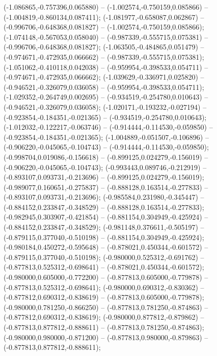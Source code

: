  (-1.086865,-0.757396,0.065880) -- (-1.002574,-0.750159,0.085866) -- (-1.004819,-0.860134,0.087411);
 (-1.081977,-0.658087,0.062867) -- (-0.996706,-0.648368,0.081827) -- (-1.002574,-0.750159,0.085866);
 (-1.074148,-0.567053,0.058040) -- (-0.987339,-0.555715,0.075381) -- (-0.996706,-0.648368,0.081827);
 (-1.063505,-0.484865,0.051479) -- (-0.974671,-0.472935,0.066662) -- (-0.987339,-0.555715,0.075381);
 (-1.051062,-0.410118,0.042038) -- (-0.959954,-0.398533,0.054711) -- (-0.974671,-0.472935,0.066662);
 (-1.039629,-0.336971,0.025820) -- (-0.946521,-0.326079,0.036058) -- (-0.959954,-0.398533,0.054711);
 (-1.029352,-0.264749,0.002695) -- (-0.934519,-0.254780,0.010643) -- (-0.946521,-0.326079,0.036058);
 (-1.020171,-0.193232,-0.027194) -- (-0.923854,-0.184351,-0.021365) -- (-0.934519,-0.254780,0.010643);
 (-1.012032,-0.122217,-0.063746) -- (-0.914444,-0.114530,-0.059850) -- (-0.923854,-0.184351,-0.021365);
 (-1.004889,-0.051507,-0.106896) -- (-0.906220,-0.045065,-0.104743) -- (-0.914444,-0.114530,-0.059850);
 (-0.998704,0.019086,-0.156618) -- (-0.899125,0.024279,-0.156019) -- (-0.906220,-0.045065,-0.104743);
 (-0.993443,0.089746,-0.212919) -- (-0.893107,0.093731,-0.213696) -- (-0.899125,0.024279,-0.156019);
 (-0.989077,0.160651,-0.275837) -- (-0.888128,0.163514,-0.277833) -- (-0.893107,0.093731,-0.213696);
 (-0.985584,0.231980,-0.345447) -- (-0.884152,0.233847,-0.348529) -- (-0.888128,0.163514,-0.277833);
 (-0.982945,0.303907,-0.421854) -- (-0.881154,0.304949,-0.425924) -- (-0.884152,0.233847,-0.348529);
 (-0.981148,0.376611,-0.505197) -- (-0.879115,0.377040,-0.510198) -- (-0.881154,0.304949,-0.425924);
 (-0.980184,0.450272,-0.595648) -- (-0.878021,0.450344,-0.601572) -- (-0.879115,0.377040,-0.510198);
 (-0.980000,0.525312,-0.691762) -- (-0.877813,0.525312,-0.698641) -- (-0.878021,0.450344,-0.601572);
 (-0.980000,0.605000,-0.772200) -- (-0.877813,0.605000,-0.779878) -- (-0.877813,0.525312,-0.698641);
 (-0.980000,0.690312,-0.830362) -- (-0.877812,0.690312,-0.838619) -- (-0.877813,0.605000,-0.779878);
 (-0.980000,0.781250,-0.866250) -- (-0.877813,0.781250,-0.874863) -- (-0.877812,0.690312,-0.838619);
 (-0.980000,0.877812,-0.879862) -- (-0.877813,0.877812,-0.888611) -- (-0.877813,0.781250,-0.874863);
 (-0.980000,0.980000,-0.871200) -- (-0.877813,0.980000,-0.879863) -- (-0.877813,0.877812,-0.888611);
